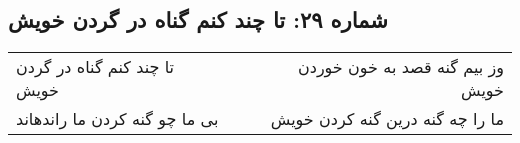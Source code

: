 \begin{center}
\section*{شماره ۲۹: تا چند کنم گناه در گردن خویش}
\label{sec:029}
\begin{longtable}{l p{0.5cm} r}
تا چند کنم گناه در گردن خویش
&&
وز بیم گنه قصد به خون خوردن خویش
\\
بی ما چو گنه کردن ما راندهاند
&&
ما را چه گنه درین گنه کردن خویش
\\
\end{longtable}
\end{center}
